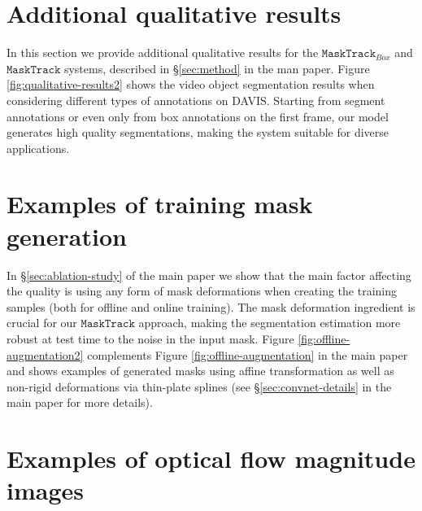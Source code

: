 \documentclass[10pt,twocolumn,letterpaper]{article}
\begin{document}
\section{Additional qualitative results}
\label{sec:add_qual_res}

In this section we provide additional qualitative results for the $\mathtt{MaskTrack}_{Box}$ and $\mathtt{MaskTrack}$ systems, described in \S\ref{sec:method} in the man paper.
Figure \ref{fig:qualitative-results2} shows the video object segmentation results when considering different types of annotations on DAVIS. Starting from segment annotations or even only from box annotations
on the first frame, our model generates high quality segmentations, making the system suitable for diverse applications.


\section{Examples of training mask generation}
\label{sec:mask_gen}

In \S\ref{sec:ablation-study} of the main paper we show that the main factor affecting the quality is using any form of mask deformations when creating the training samples (both for offline and online training).
The mask deformation ingredient is crucial for our $\mathtt{MaskTrack}$ approach, making the segmentation estimation more robust at test time to the noise in the input mask.
Figure \ref{fig:offline-augmentation2} complements Figure \ref{fig:offline-augmentation}  in the main paper and shows examples of generated masks using affine transformation as well as non-rigid deformations via thin-plate splines
(see \S\ref{sec:convnet-details} in the main paper for more details).


\section{Examples of optical flow magnitude images}
\label{sec:flow_gen}
\end{document}
